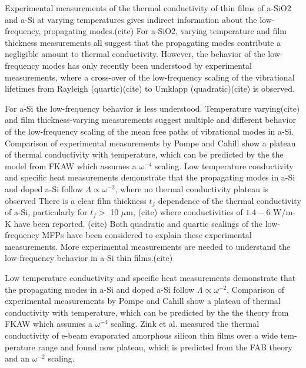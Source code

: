 \documentclass[aps,prb,twocolumn,superscriptaddress,footinbib,amsmath,amssymb,floatfix]{revtex4}
\begin{document}
Experimental measurements of the thermal conductivity of
thin films of a-SiO2 and a-Si at varying temperatures 
gives indirect information about the low-frequency, propagating 
modes.(cite) For a-SiO2, 
varying temperature 
and film thickness
\cite{lee_heat_1997,yamane_measurement_2002} 
measurements all suggest that the propagating modes 
contribute a negligible amount to thermal conductivity. 
However, the behavior of the low-frequency modes 
has only recently been understood by experimental 
measurements,
\cite{masciovecchio_evidence_2006,baldi_thermal_2008,
baldi_sound_2010,baldi_elastic_2011,baldi_emergence_2013} 
where a cross-over of the low-frequency scaling of 
the vibrational lifetimes from Rayleigh (quartic)(cite) 
to Umklapp (quadratic)(cite) is observed.

For a-Si the low-frequency behavior is less understood. Temperature 
varying(cite) and film thickness-varying measurements
\cite{hasselman_thermal_1989,wada_thermal_1996,zink_thermal_2006,
yang_anomalously_2010,cahill_thermal_1994,kuo_thermal_1992,
moon_thermal_2002,liu_high_2009}
suggest multiple and different behavior of the low-frequency 
scaling of the mean free paths of vibrational modes in a-Si. 
Comparison of experimental measurements by 
Pompe\cite{pompe_thermal_1988} and Cahill
\cite{cahill_thermal_1989,cahill_thermal_1994} show a plateau of 
thermal conductivity with temperature, 
which can be predicted by the the model from FKAW which assumes a 
$\omega^{-4}$ scaling.\cite{feldman_thermal_1993}
Low temperature conductivity and specific heat measurements demonstrate 
that the propagating modes in a-Si and doped a-Si follow 
$\Lambda \propto \omega^{-2}$,
\cite{zink_thermal_2006,zink_excess_2006} where no 
thermal conductivity plateau is observed
\cite{zink_thermal_2006,zink_excess_2006,yang_anomalously_2010} 
There is a clear film thickness $t_f$ dependence of the thermal 
conductivity of a-Si, particularly for $t_f>$ 10 $\mu$m,
(cite) where conductivities of $1.4-6$ W/m-K have been reported.
(cite) 
Both quadratic\cite{feldman_numerical_1999} 
and 
quartic\cite{feldman_thermal_1993,cahill_lower_1994,
yang_anomalously_2010} 
scalings of the low-frequency MFPs 
have been considered to explain these experimental measurements. 
More experimental measurements are needed to understand 
the low-frequency behavior in a-Si thin films.(cite) 

Low temperature conductivity and specific heat measurements demonstrate 
that the propagating modes in a-Si and doped a-Si follow 
$\Lambda \propto \omega^{-2}$.
\cite{zink_thermal_2006,zink_excess_2006} 
Comparison of experimental measurements by 
Pompe\cite{pompe_thermal_1988} and Cahill
\cite{cahill_thermal_1989,cahill_thermal_1994} show a plateau of 
thermal conductivity with temperature, 
which can be predicted by the the theory from FKAW which assumes a 
$\omega^{-4}$ scaling.\cite{feldman_thermal_1993}  
Zink et al. measured the thermal conductivity of e-beam
evaporated amorphous silicon thin films over a wide tem-
perature range and found now plateau, which is predicted from the 
FAB theory and an $\omega^{-2}$ scaling.\cite{feldman_numerical_1999}  
\end{document}
